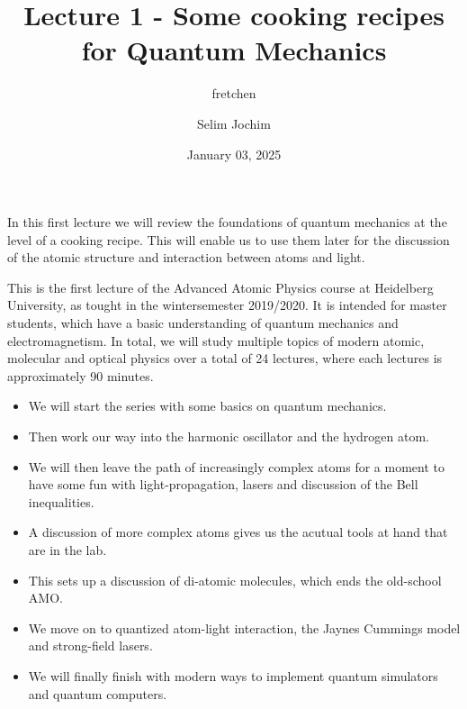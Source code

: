 \documentclass[10pt]{article}
\renewenvironment{abstract}
  {{\bfseries\noindent{\abstractname}\par\nobreak}\footnotesize}
  {\bigskip}
\begin{document}
\title{Lecture 1 - Some cooking recipes for Quantum Mechanics}



\author[1]{fretchen}%
\author[2]{Selim Jochim}%
%
%


\vspace{-1em}



  
  \date{January 03, 2025}


\begingroup
\let\center\flushleft
\let\endcenter\endflushleft
\maketitle
\endgroup





\begin{abstract}
In this first lecture we will review the foundations of quantum mechanics at the level of a cooking recipe. This will enable us to use them later for the discussion of the atomic structure and interaction between atoms and light.%
\end{abstract}%



\sloppy


This is the first lecture of the Advanced Atomic Physics course at Heidelberg University, as tought in the wintersemester 2019/2020.
It is intended for master students, which have a basic understanding of quantum mechanics and electromagnetism. In total, we will study multiple topics of modern atomic, molecular and optical physics over a total of 24 lectures, where each lectures is approximately 90 minutes. 
\begin{itemize}
\item We will start the series with some basics on quantum mechanics.
\item Then work our way into the harmonic oscillator and the hydrogen atom.
\item We will then leave the path of increasingly complex atoms for a moment to have some fun with light-propagation, lasers and discussion of the Bell inequalities.
\item A discussion of more complex atoms gives us the acutual tools at hand that are in the lab.
\item This sets up a discussion of di-atomic molecules, which ends the old-school AMO.
\item We move on to quantized atom-light interaction, the Jaynes Cummings model and strong-field lasers.
\item We will finally finish with modern ways to implement quantum simulators and quantum computers.
\end{itemize}
\end{document}
